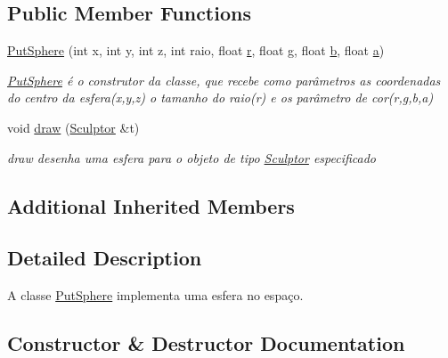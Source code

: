 \subsection*{Public Member Functions}
\begin{DoxyCompactItemize}
\item 
\hyperlink{class_put_sphere_a0b70b6e3dba80000008282f38416537c}{Put\+Sphere} (int x, int y, int z, int raio, float \hyperlink{class_figura_geometrica_a0a4f57efb1a6c525c8aeee34c92e7eab}{r}, float \hyperlink{class_figura_geometrica_a51930549bcb90d016b824f10f95df355}{g}, float \hyperlink{class_figura_geometrica_a25e5d6c21410103c25ec55c0117dac0d}{b}, float \hyperlink{class_figura_geometrica_ae7c8a027fcec3c357265b90458a4d165}{a})
\begin{DoxyCompactList}\small\item\em \hyperlink{class_put_sphere}{Put\+Sphere} é o construtor da classe, que recebe como parâmetros as coordenadas do centro da esfera(x,y,z) o tamanho do raio(r) e os parâmetro de cor(r,g,b,a) \end{DoxyCompactList}\item 
void \hyperlink{class_put_sphere_a5105d1e171563e16c148d8f715321b24}{draw} (\hyperlink{class_sculptor}{Sculptor} \&t)
\begin{DoxyCompactList}\small\item\em draw desenha uma esfera para o objeto de tipo \hyperlink{class_sculptor}{Sculptor} especificado \end{DoxyCompactList}\end{DoxyCompactItemize}
\subsection*{Additional Inherited Members}


\subsection{Detailed Description}
A classe \hyperlink{class_put_sphere}{Put\+Sphere} implementa uma esfera no espaço. 

\subsection{Constructor \& Destructor Documentation}
\mbox{\label{class_put_sphere_a0b70b6e3dba80000008282f38416537c}} 
